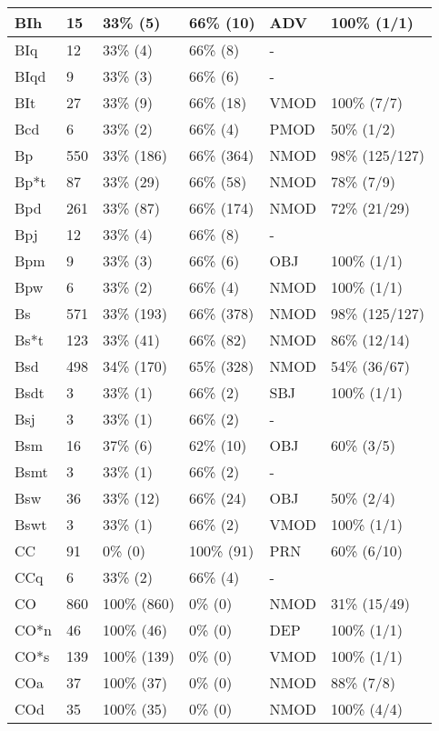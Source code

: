 \begin{figure*}
\begin{tabular}{|l|l|l|l||l|l|}
\hline
 BIh & 15 & 33\% (5) & 66\% (10) & ADV & 100\% (1/1) \\ 
\hline
 BIq & 12 & 33\% (4) & 66\% (8) & - &  \\ 
\hline
 BIqd & 9 & 33\% (3) & 66\% (6) & - &  \\ 
\hline
 BIt & 27 & 33\% (9) & 66\% (18) & VMOD & 100\% (7/7) \\ 
\hline
 Bcd & 6 & 33\% (2) & 66\% (4) & PMOD & 50\% (1/2) \\ 
\hline
 Bp & 550 & 33\% (186) & 66\% (364) & NMOD & 98\% (125/127) \\ 
\hline
 Bp*t & 87 & 33\% (29) & 66\% (58) & NMOD & 78\% (7/9) \\ 
\hline
 Bpd & 261 & 33\% (87) & 66\% (174) & NMOD & 72\% (21/29) \\ 
\hline
 Bpj & 12 & 33\% (4) & 66\% (8) & - &  \\ 
\hline
 Bpm & 9 & 33\% (3) & 66\% (6) & OBJ & 100\% (1/1) \\ 
\hline
 Bpw & 6 & 33\% (2) & 66\% (4) & NMOD & 100\% (1/1) \\ 
\hline
 Bs & 571 & 33\% (193) & 66\% (378) & NMOD & 98\% (125/127) \\ 
\hline
 Bs*t & 123 & 33\% (41) & 66\% (82) & NMOD & 86\% (12/14) \\ 
\hline
 Bsd & 498 & 34\% (170) & 65\% (328) & NMOD & 54\% (36/67) \\ 
\hline
 Bsdt & 3 & 33\% (1) & 66\% (2) & SBJ & 100\% (1/1) \\ 
\hline
 Bsj & 3 & 33\% (1) & 66\% (2) & - &  \\ 
\hline
 Bsm & 16 & 37\% (6) & 62\% (10) & OBJ & 60\% (3/5) \\ 
\hline
 Bsmt & 3 & 33\% (1) & 66\% (2) & - &  \\ 
\hline
 Bsw & 36 & 33\% (12) & 66\% (24) & OBJ & 50\% (2/4) \\ 
\hline
 Bswt & 3 & 33\% (1) & 66\% (2) & VMOD & 100\% (1/1) \\ 
\hline
 CC & 91 & 0\% (0) & 100\% (91) & PRN & 60\% (6/10) \\ 
\hline
 CCq & 6 & 33\% (2) & 66\% (4) & - &  \\ 
\hline
 CO & 860 & 100\% (860) & 0\% (0) & NMOD & 31\% (15/49) \\ 
\hline
 CO*n & 46 & 100\% (46) & 0\% (0) & DEP & 100\% (1/1) \\ 
\hline
 CO*s & 139 & 100\% (139) & 0\% (0) & VMOD & 100\% (1/1) \\ 
\hline
 COa & 37 & 100\% (37) & 0\% (0) & NMOD & 88\% (7/8) \\ 
\hline
 COd & 35 & 100\% (35) & 0\% (0) & NMOD & 100\% (4/4) \\ 
\hline
\end{tabular}
\end{figure*}

